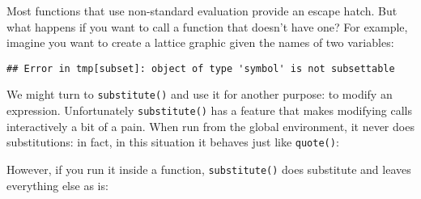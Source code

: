 Most functions that use non-standard evaluation provide an escape hatch.
But what happens if you want to call a function that doesn't have one?
For example, imagine you want to create a lattice graphic given the
names of two variables: 

\begin{Shaded}
\begin{Highlighting}[]
\OperatorTok{~}\StringTok{ }

\StringTok{ }
\StringTok{ }
\OperatorTok{~}\StringTok{ }
\end{Highlighting}
\end{Shaded}

\begin{verbatim}
## Error in tmp[subset]: object of type 'symbol' is not subsettable
\end{verbatim}

We might turn to \texttt{substitute()} and use it for another purpose:
to modify an expression. Unfortunately \texttt{substitute()} has a
feature that makes modifying calls interactively a bit of a pain. When
run from the global environment, it never does substitutions: in fact,
in this situation it behaves just like \texttt{quote()}:

\begin{Shaded}
\begin{Highlighting}[]
\StringTok{ }
\StringTok{ }
\OperatorTok{+}\StringTok{ }\OperatorTok{+}\StringTok{ }
\end{Highlighting}
\end{Shaded}

However, if you run it inside a function, \texttt{substitute()} does
substitute and leaves everything else as is:

\begin{Shaded}
\begin{Highlighting}[]
\StringTok{ }\NormalTok{() \{}
\StringTok{ }
\StringTok{ }
  \OperatorTok{+}\StringTok{ }\OperatorTok{+}\StringTok{ }
\NormalTok{\}}
\NormalTok{()}
\end{Highlighting}
\end{Shaded}

